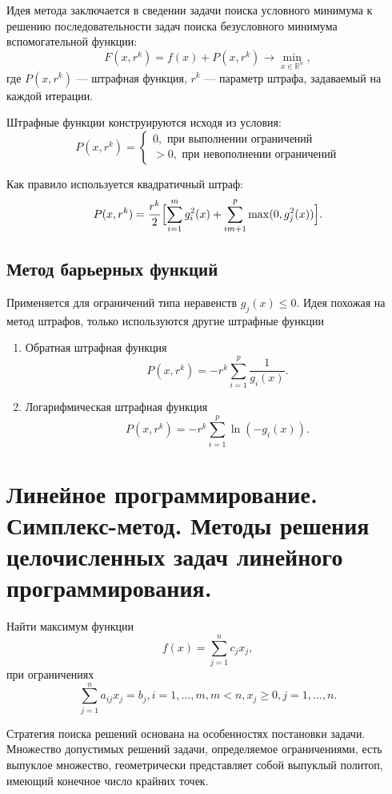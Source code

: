 \documentclass[12pt]{report}
\theoremstyle{definition}
\newcommand{\R}{\mathbb R}
\begin{document}
Идея метода заключается в сведении задачи поиска условного минимума к решению
последовательности задач поиска безусловного минимума вспомогательной функции:
$$
  F(x, r^k) = f(x) + P(x, r^k) \rightarrow \min\limits_{x \in \R^n},
$$
где $P(x, r^k)$ --- штрафная функция, $r^k$ --- параметр штрафа, задаваемый на каждой
итерации.

Штрафные функции конструируются исходя из условия:
$$
P(x, r^k) = 
\begin{cases}
0, \text{ при выполнении ограничений} \\
> 0, \text{ при невополнении ограничений}
\end{cases}
$$

Как правило используется квадратичный штраф:
$$
P(x, r^k) = 
\dfrac{r^k}{2} \Bigl[\sum\limits_{i = 1}^m g^2_i(x) + \sum\limits_{i  m + 1}^p \max(0, g^2_j(x)) \Bigl].
$$

\subsection{Метод барьерных функций}
Применяется для ограничений типа неравенств $g_j(x) \le 0$.
Идея похожая на метод штрафов, только используются другие штрафные функции
\begin{enumerate}
\item Обратная штрафная функция
$$
P(x, r^k) = -r^k \sum\limits_{i = 1}^p \dfrac{1}{g_i(x)}.
$$
\item Логарифмическая штрафная функция
$$
P(x, r^k) = -r^k \sum\limits_{i = 1}^p \ln(-g_i(x)).
$$
\end{enumerate}



\section
{
  Линейное программирование. Симплекс-метод.
  Методы решения целочисленных задач линейного программирования.
}

Найти максимум функции
$$
f(x) = \sum\limits_{j = 1}^n c_j x_j,
$$
при ограничениях
$$
\sum\limits_{j = 1}^n a_{ij} x_j = b_j, i = 1, \dots, m, m < n,
x_j \ge 0, j = 1, \dots, n.
$$

Стратегия поиска решений основана на особенностях постановки задачи.
Множество допустимых решений задачи, определяемое ограничениями, есть
выпуклое множество, геометрически представляет собой выпуклый политоп,
имеющий конечное число крайних точек.
\end{document}
